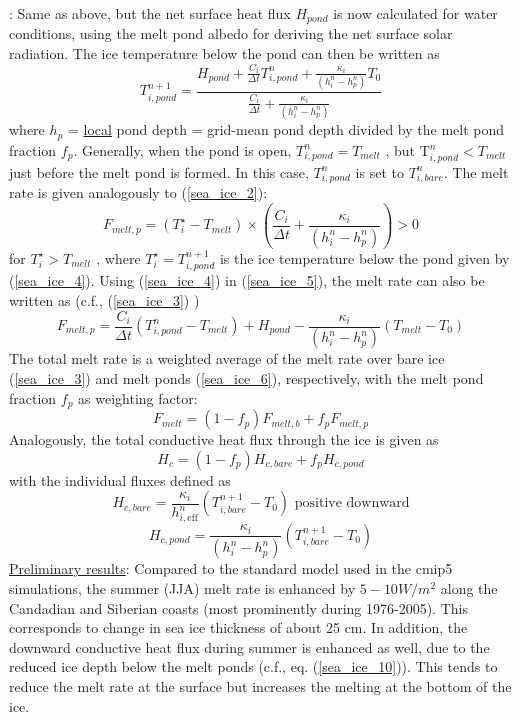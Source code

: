 \vspace{2cm}
: Same as above, but the net surface heat flux $H_{pond}$ is now calculated for
water conditions, using the melt pond albedo for deriving the net surface solar radiation. The
ice temperature below the pond can then be written as
\begin{equation}
T_{i,pond}^{n+1}=\frac{ H_{pond} + \frac{C_i}{\Delta t} T_{i,pond}^n +\frac{\kappa_i}{\left (h_{i}^n-h_{p}^n \right )} T_0 } {\frac{C_i}{\Delta t}+\frac{\kappa_i}{\left (h_i^n-h_p^n \right )} } \label{sea_ice_4}
\end{equation}
where $h_p$ = \underline{local} pond depth = grid-mean pond depth divided by the melt pond fraction $f_p$.
Generally, when the pond is open, $T_{i,pond}^n = T_{melt}$ , but T$_{i,pond}^n < T_{melt}$ just before the melt pond is
formed. In this case, $T_{i,pond}^n$ is set to $T_{i,bare}^n$. The melt rate is given analogously to (\eqref{sea_ice_2}):
\begin{equation}
F_{melt,p}=\left (T_{i}^{\star}-T_{melt} \right)\times \left ( \frac{C_i}{\Delta t} + \frac{\kappa_i}{\left(h_i^n-h_p^n \right)} \right )>0  \label{sea_ice_5}
\end{equation}
for $T_i^{\star}>T_{melt}$ , where $ T_i^{\star} = T_{i,pond}^{n+1}$ is the ice temperature below the pond given by (\eqref{sea_ice_4}). Using
(\eqref{sea_ice_4}) in (\eqref{sea_ice_5}), the melt rate can also be written as (c.f., (\eqref{sea_ice_3}) )
\begin{equation}
F_{melt,p}=\frac{C_i}{\Delta t}\left (T_{i,pond}^{n}-T_{melt} \right)+H_{pond}-\frac{\kappa_i}{\left(h_i^n-h_p^n \right)} \left (T_{melt}-T_0 \right) \label{sea_ice_6}
\end{equation}
The total melt rate is a weighted average of the melt rate over bare ice (\eqref{sea_ice_3}) and melt ponds
(\eqref{sea_ice_6}), respectively, with the melt pond fraction $f_p$ as weighting factor:
\begin{equation}
F_{melt}=(1-f_p)F_{melt,b}+f_pF_{melt,p}
\end{equation}
Analogously, the total conductive heat flux through the ice is given as
\begin{equation}
H_{c}=(1-f_p)H_{c,bare}+f_p H_{c,pond}
\end{equation}
with the individual fluxes defined as
\begin{equation}
H_{c,bare}=\frac{\kappa_i}{h_{i,\text{eff}}^n}\left(T_{i,bare}^{n+1}-T_0\right) \text{ positive downward}
\end{equation}
\begin{equation}
H_{c,pond}=\frac{\kappa_i}{\left(h_i^n-h_p^n \right)}\left(T_{i,bare}^{n+1}-T_0\right) \label{sea_ice_10}
\end{equation}
\underline{Preliminary results}:
Compared to the standard model used in the cmip5 simulations, the summer (JJA) melt rate
is enhanced by $5-10 W/m^2$ along the Candadian and Siberian coasts (most prominently
during 1976-2005). This corresponds to change in sea ice thickness of about 25 cm. In
addition, the downward conductive heat flux during summer is enhanced as well, due to the
reduced ice depth below the melt ponds (c.f., eq. (\eqref{sea_ice_10})). This tends to reduce the melt rate at
the surface but increases the melting at the bottom of the ice.
